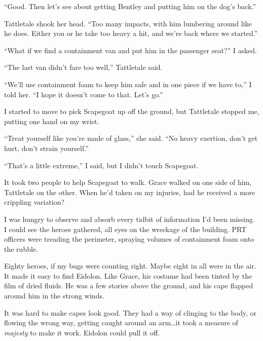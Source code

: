 ``Good.  Then let's see about getting Bentley and putting him on the dog's back.''



Tattletale shook her head.  ``Too many impacts, with him lumbering around like he does.  Either you or he take too heavy a hit, and we're back where we started.''



``What if we find a containment van and put him in the passenger seat?'' I asked.



``The last van didn't fare too well,'' Tattletale said.



``We'll use containment foam to keep him safe and in one piece if we have to,'' I told her.  ``I hope it doesn't come to that.  Let's go.''



I started to move to pick Scapegoat up off the ground, but Tattletale stopped me, putting one hand on my wrist.



``Treat yourself like you're made of glass,'' she said.  ``No heavy exertion, don't get hurt, don't strain yourself.''



``That's a little extreme,'' I said, but I didn't touch Scapegoat.



It took two people to help Scapegoat to walk.  Grace walked on one side of him, Tattletale on the other.  When he'd taken on my injuries, had he received a more crippling variation?



I was hungry to observe and absorb every tidbit of information I'd been missing.  I could see the heroes gathered, all eyes on the wreckage of the building.  PRT officers were treading the perimeter, spraying volumes of containment foam onto the rubble.



Eighty heroes, if my bugs were counting right.  Maybe eight in all were in the air.  It made it easy to find Eidolon.  Like Grace, his costume had been tinted by the film of dried fluids.  He was a few stories above the ground, and his cape flapped around him in the strong winds.



It was hard to make capes look good.  They had a way of clinging to the body, or flowing the wrong way, getting caught around an arm\ldots it took a measure of \emph{majesty} to make it work.  Eidolon could pull it off.



